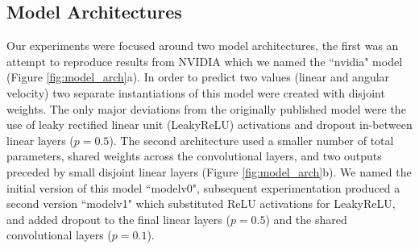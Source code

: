 \documentclass{article}
\begin{document}
\subsection{Model Architectures} \label{sec:model_arch}

    Our experiments were focused around two model architectures, the first was an attempt to reproduce results from NVIDIA \cite{DBLP:journals/corr/BojarskiTDFFGJM16} which we named the ``nvidia" model (Figure \ref{fig:model_arch}a). In order to predict two values (linear and angular velocity) two separate instantiations of this model were created with disjoint weights. The only major deviations from the originally published model were the use of leaky rectified linear unit (LeakyReLU) activations and dropout in-between linear layers ($p=0.5$).
    The second architecture used a smaller number of total parameters, shared weights across the convolutional layers, and two outputs preceded by small disjoint linear layers (Figure \ref{fig:model_arch}b). We named the initial version of this model ``modelv0", subsequent experimentation produced a second version ``modelv1" which substituted ReLU activations for LeakyReLU, and added dropout to the final linear layers ($p=0.5$) and the shared convolutional layers ($p=0.1$).
\end{document}
